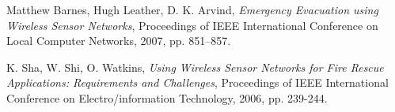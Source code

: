 \documentclass{../local}
\begin{document}
\begin{thebibliography}{9}

 Matthew Barnes, Hugh Leather, D. K. Arvind, \emph{Emergency Evacuation using Wireless Sensor Networks}, Proceedings of IEEE International Conference on Local Computer Networks, 2007, pp. 851–857.

 K. Sha, W. Shi, O. Watkins, \emph{Using Wireless Sensor Networks for Fire Rescue Applications: Requirements and Challenges}, Proceedings of IEEE International Conference on Electro/information Technology, 2006, pp. 239-244.


\end{thebibliography}
\end{document}
